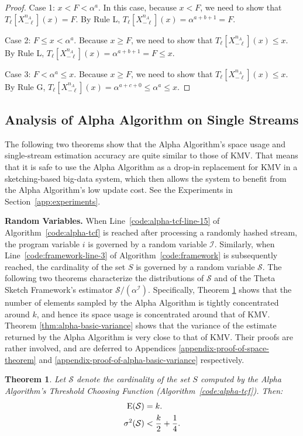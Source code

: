 \documentclass{article}
\newcommand{\xnml}{X^{n_A}_{-\ell}}
\newcommand{\ept}{\operatornamewithlimits{E}}
\newcommand{\edit}[1]{{#1}}
\newtheorem{theorem}{Theorem}[section]
\begin{document}
\begin{proof}
Case 1: $x < F < \alpha^a$. In this case, because $x < F$, we need to show that $T_\ell[\xnml](x) = F$.
By Rule \edit{L}, $T_\ell[\xnml](x) = \alpha^{a + b + 1} = F$.

Case 2: $F \le x < \alpha^a$. Because $x \ge F$, we need to show that $T_\ell[\xnml](x) \le x$. 
By Rule \edit{L}, $T_\ell[\xnml](x) = \alpha^{a + b + 1} = F \le x$.

Case 3: $F < \alpha^a \le x$. Because $x \ge F$, we need to show that $T_\ell[\xnml](x) \le x$. 
By Rule \edit{G}, $T_\ell[\xnml](x) = \alpha^{a + c + 0} \le \alpha^a \le x$.
\end{proof}

\subsection{Analysis of Alpha Algorithm on Single Streams}\label{sec:alpha-space}
The following two theorems show that the Alpha Algorithm's space usage
and single-stream estimation accuracy are quite similar to those of KMV.
That means that it is safe to use the Alpha Algorithm as a drop-in replacement
for KMV in a sketching-based big-data system, which then allows the system to benefit 
from the Alpha Algorithm's low update cost. See the Experiments in Section~\ref{app:experiments}.

\noindent \textbf{Random Variables.} When Line~\ref{code:alpha-tcf-line-15} of
Algorithm~\ref{code:alpha-tcf} is reached after processing a randomly hashed
stream, the program variable $i$ is governed by a random variable $\mathcal{I}$.
Similarly, when Line~\ref{code:framework-line-3} of Algorithm~\ref{code:framework}
is subsequently reached, the cardinality of the set $S$ is governed by a random 
variable $\mathcal{S}$. The following two theorems characterize the distributions
of $\mathcal{S}$ and of the Theta Sketch Framework's estimator $\mathcal{S}/(\alpha^\mathcal{I})$.
Specifically, Theorem \ref{space-theorem} shows that the number of elements sampled by the Alpha Algorithm is tightly concentrated around $k$,
and hence its space usage is concentrated around that of KMV.
Theorem \ref{thm:alpha-basic-variance} shows that the variance of the estimate returned by the Alpha Algorithm
is very close to that of KMV.
Their proofs are rather involved, and are deferred to Appendices \ref{appendix-proof-of-space-theorem} and
\ref{appendix-proof-of-alpha-basic-variance} respectively.

\begin{theorem}\label{space-theorem}
Let $\mathcal{S}$ denote the cardinality of the set $S$ computed by the Alpha Algorithm's Threshold Choosing Function (Algorithm~\ref{code:alpha-tcf}). Then:
\begin{align} 
\ept(\mathcal{S}) = & \; k. \\
\sigma^2(\mathcal{S}) < & \; \frac{k}{2} + \frac{1}{4}.
\end{align}
\end{theorem}
\end{document}
